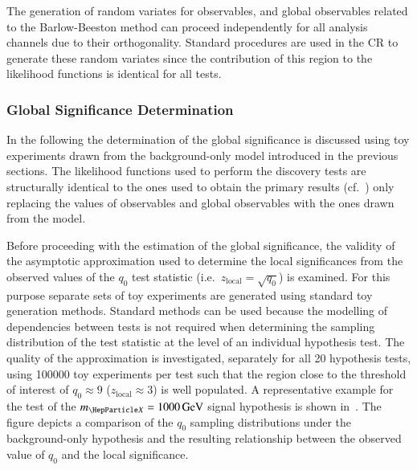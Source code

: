 The generation of random variates for observables, and global observables
related to the Barlow-Beeston method can proceed independently for all analysis
channels due to their orthogonality. Standard procedures are used in the CR to
generate these random variates since the contribution of this region to the
likelihood functions is identical for all tests.


%
%
%

\subsubsection{Global Significance Determination}

In the following the determination of the global significance is discussed using
toy experiments drawn from the background-only model introduced in the previous
sections. The likelihood functions used to perform the discovery tests are
structurally identical to the ones used to obtain the primary results (cf.\
) only replacing the values of observables and
global observables with the ones drawn from the model.

Before proceeding with the estimation of the global significance, the validity
of the asymptotic approximation used to determine the local significances from
the observed values of the $q_0$ test statistic (i.e.\
$z_{\text{local}} = \sqrt{q_0}$) is examined. For this purpose separate sets of
toy experiments are generated using standard toy generation methods. Standard
methods can be used because the modelling of dependencies between tests is not
required when determining the sampling distribution of the test statistic at the
level of an individual hypothesis test. The quality of the approximation is
investigated, separately for all 20 hypothesis tests, using \num{100000} toy
experiments per test such that the region close to the threshold of interest of
$q_0 \approx 9$ ($z_{\text{local}} \approx 3$) is well populated. A
representative example for the test of the $\mX = \SI{1000}{\GeV}$ signal
hypothesis is shown in~\Cref{fig:q0_samplingdist}. The figure depicts a
comparison of the $q_0$ sampling distributions under the background-only
hypothesis and the resulting relationship between the observed value of $q_0$
and the local significance.

